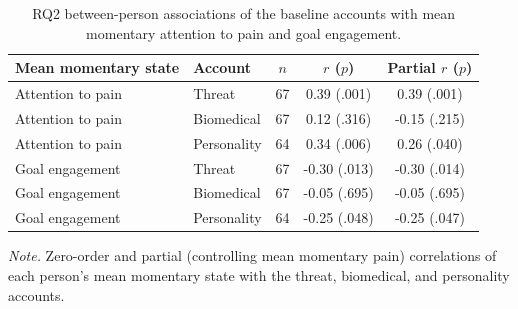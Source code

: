 \begin{table}[!htbp]
\raggedright
\caption{RQ2 between-person associations of the baseline accounts with mean momentary attention to pain and goal engagement.}
\label{tab:link}
\footnotesize
\begingroup
\setlength{\tabcolsep}{4pt}
\renewcommand{\arraystretch}{1.08}
\noindent
\begin{tabular*}{\textwidth}{@{\extracolsep{\fill}}llccc@{}}
\toprule
Mean momentary state & Account & $n$ & $r$ ($p$) & Partial $r$ ($p$) \\
\midrule
Attention to pain & Threat & 67 & 0.39 (.001) & 0.39 (.001) \\
Attention to pain & Biomedical & 67 & 0.12 (.316) & -0.15 (.215) \\
Attention to pain & Personality & 64 & 0.34 (.006) & 0.26 (.040) \\
Goal engagement & Threat & 67 & -0.30 (.013) & -0.30 (.014) \\
Goal engagement & Biomedical & 67 & -0.05 (.695) & -0.05 (.695) \\
Goal engagement & Personality & 64 & -0.25 (.048) & -0.25 (.047) \\
\bottomrule
\end{tabular*}
\par\vspace{3pt}\noindent\parbox{\textwidth}{\footnotesize\textit{Note.} Zero-order and partial (controlling mean momentary pain) correlations of each person's mean momentary state with the threat, biomedical, and personality accounts.}
\endgroup
\end{table}
